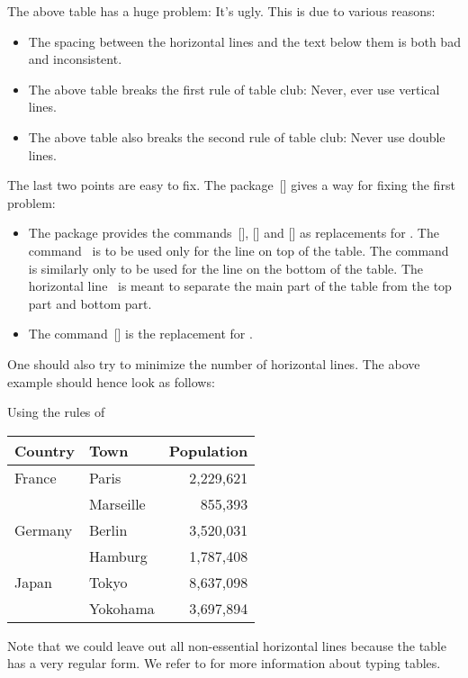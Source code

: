 The above table has a huge problem:
It’s ugly.
This is due to various reasons:
\begin{itemize}
  \item
    The spacing between the horizontal lines and the text below them is both bad and inconsistent.
  \item
    The above table breaks the first rule of table club:
    Never, ever use vertical lines.
  \item
    The above table also breaks the second rule of table club:
    Never use double lines.
\end{itemize}
The last two points are easy to fix.
The package~[\packname] gives a way for fixing the first problem:
\begin{itemize}
  \item
    The package provides the commands~[\comname], [\comname] and [\comname] as replacements for .
    The command~ is to be used only for the line on top of the table.
    The command~ is similarly only to be used for the line on the bottom of the table.
    The horizontal line~ is meant to separate the main part of the table from the top part and bottom part.
  \item
    The command~[\comname] is the replacement for .
\end{itemize}
One should also try to minimize the number of horizontal lines.
The above example should hence look as follows:
\begin{showlatex}{Using the rules of }
\begin{center}
\begin{tabular}{llr}
  \toprule
  \textbf{Country}  &  \textbf{Town}  & \textbf{Population} \\
  \midrule
  France            & Paris           & 2,229,621           \\
  {}                & Marseille       &   855,393           \\
  Germany           & Berlin          & 3,520,031           \\
  {}                & Hamburg         & 1,787,408           \\
  Japan             & Tokyo           & 8,637,098           \\
  {}                & Yokohama        & 3,697,894           \\
  \bottomrule
\end{tabular}
\end{center}
\end{showlatex}

Note that we could leave out all non-essential horizontal lines because the table has a very regular form.
We refer to \cite{booktab} for more information about typing tables.




